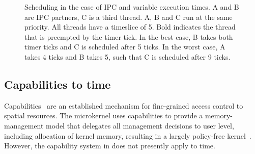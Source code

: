 \begin{figure}
      \centering
      \caption{Scheduling in the case of IPC and variable execution times. A
and B are IPC partners, C is a third thread. A, B and C run at the same
priority. All threads have a timeslice of 5. Bold indicates the thread that is
preempted by the timer tick. In the best case, B takes both timer ticks and C
is scheduled after 5 ticks. In the worst case, A takes 4 ticks and B takes 5,
such that C is scheduled after 9 ticks.} \label{fig:non-determinism}
  \end{figure}

\subsection{Capabilities to time}
\label{s:capabilities}

Capabilities~\citep{Dennis_VanHorn_66} are an established mechanism for
fine-grained access control to spatial resources. The  \selfour
microkernel uses capabilities to provide a memory-management model
that delegates all management decisions to user level,
including allocation of kernel memory, resulting in a largely
policy-free
kernel~\citep{Elkaduwe_DE_08,Heiser_Elphinstone_16}.
However, the capability system in \selfour does not presently apply to time.

